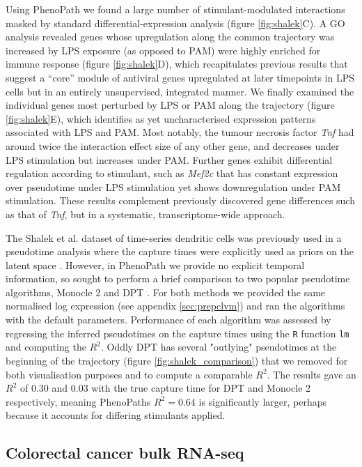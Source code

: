 Using PhenoPath we found a large number of stimulant-modulated interactions masked by standard differential-expression analysis (figure \ref{fig:shalek}C). A GO analysis revealed genes whose upregulation along the common trajectory was increased by LPS exposure (as opposed to PAM) were highly enriched for immune response (figure \ref{fig:shalek}D), which recapitulates previous results \cite{Shalek2014-cg,Reid2016-yo} that suggest a ``core'' module of antiviral genes upregulated at later timepoints in LPS cells but in an entirely unsupervised, integrated manner. We finally examined the individual genes most perturbed by LPS or PAM along the trajectory (figure \ref{fig:shalek}E), which identifies as yet uncharacterised expression patterns associated with LPS and PAM. 
Most notably, the tumour necrosis factor \emph{Tnf} had around twice the interaction effect size of any other gene, and decreases under LPS stimulation but increases under PAM.
Further genes exhibit differential regulation according to stimulant, such as \emph{Mef2c} that has constant expression over pseudotime under LPS stimulation yet shows downregulation under PAM stimulation.
These results complement previously discovered gene differences such as that of \emph{Tnf}, but in a systematic, transcriptome-wide approach.

The Shalek et al. dataset of time-series dendritic cells was previously used in a pseudotime analysis where the capture times were explicitly used as priors on the latent space \cite{Reid2016-yo}. However, in PhenoPath we provide no explicit temporal information, so sought to perform a brief comparison to two popular pseudotime algorithms, Monocle 2 \cite{Qiu2017-eu} and DPT \cite{haghverdi2016diffusion}. For both methods we provided the same normalised log expression (see appendix \ref{sec:prepclvm}) and ran the algorithms with the default parameters. Performance of each algorithm was assessed by regressing the inferred pseudotimes on the capture times using the \texttt{R} function \texttt{lm} and computing the $R^2$. Oddly DPT has several "outlying" pseudotimes at the beginning of the trajectory (figure \ref{fig:shalek_comparison}) that we removed for both visualisation purposes and to compute a comparable $R^2$. The results gave an $R^2$ of $0.30$ and $0.03$ with the true capture time for DPT and Monocle 2 respectively, meaning PhenoPaths $R^2 = 0.64$ is significantly larger, perhaps because it accounts for differing stimulants applied. 


\subsection{Colorectal cancer bulk RNA-seq} \label{sec:coad}

